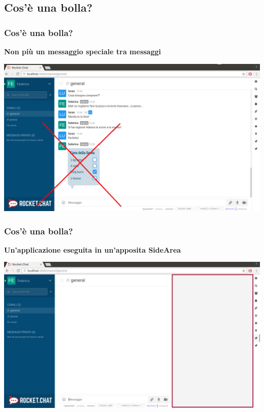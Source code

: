 \subsection{Cos'è una bolla?}
\begin{frame}
  \frametitle{Cos'è una bolla?}
  \textbf{Non più un messaggio speciale tra messaggi}
  \begin{center}
  	\includegraphics[scale=0.20]{img/f2.png}
  \end{center}

\end{frame}

\begin{frame}
  \frametitle{Cos'è una bolla?}
 \textbf{Un'applicazione eseguita in un'apposita SideArea}
\begin{center}
	\includegraphics[scale=0.20]{img/f4.png}
\end{center}
 
\end{frame}

